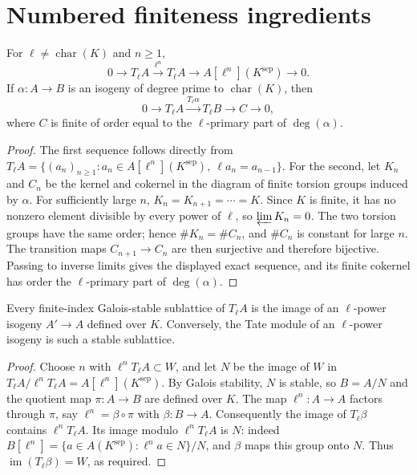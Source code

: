 \section{Numbered finiteness ingredients}

\begin{lemma}
\label{lem:milne-tate-finite-level-sequences}

For $\ell\ne\operatorname{char}(K)$ and $n\ge1$,
\[
0\longrightarrow T_\ell A\xrightarrow{\ell^n}T_\ell A
\longrightarrow A[\ell^n](K^{\mathrm{sep}})\longrightarrow0.
\]
If $\alpha:A\to B$ is an isogeny of degree prime to
$\operatorname{char}(K)$, then
\[
0\longrightarrow T_\ell A\xrightarrow{T_\ell\alpha}T_\ell B
\longrightarrow C\longrightarrow0,
\]
where $C$ is finite of order equal to the $\ell$-primary part of
$\deg(\alpha)$.
\end{lemma}

\begin{proof}

The first sequence follows directly from
$T_\ell A=\{(a_n)_{n\ge1}:a_n\in A[\ell^n](K^{\mathrm{sep}}),\ \ell a_n=a_{n-1}\}$.
For the second, let $K_n$ and $C_n$ be the kernel and cokernel in the diagram
of finite torsion groups induced by $\alpha$.  For sufficiently large $n$,
$K_n=K_{n+1}=\cdots=K$.  Since $K$ is finite, it has no nonzero element
divisible by every power of $\ell$, so $\varprojlim K_n=0$.  The two torsion
groups have the same order; hence $\#K_n=\#C_n$, and $\#C_n$ is constant for
large $n$.  The transition maps $C_{n+1}\to C_n$ are then surjective and
therefore bijective.  Passing to inverse limits gives the displayed exact
sequence, and its finite cokernel has order the $\ell$-primary part of
$\deg(\alpha)$.

\end{proof}


\begin{lemma}
\label{lem:milne-stable-tate-lattices}

Every finite-index Galois-stable sublattice of $T_\ell A$ is the image of an
$\ell$-power isogeny $A'\to A$ defined over $K$.  Conversely, the Tate module
of an $\ell$-power isogeny is such a stable sublattice.
\end{lemma}

\begin{proof}

Choose $n$ with $\ell^nT_\ell A\subset W$, and let $N$ be the image of $W$ in
$T_\ell A/\ell^nT_\ell A=A[\ell^n](K^{\mathrm{sep}})$.  By Galois stability,
$N$ is stable, so $B=A/N$ and the quotient map $\pi:A\to B$ are defined over
$K$.  The map $\ell^n:A\to A$ factors through $\pi$, say
$\ell^n=\beta\circ\pi$ with $\beta:B\to A$.  Consequently the image of
$T_\ell\beta$ contains $\ell^nT_\ell A$.  Its image modulo
$\ell^nT_\ell A$ is $N$: indeed
$B[\ell^n]=\{a\in A(K^{\mathrm{sep}}):\ell^na\in N\}/N$, and $\beta$ maps
this group onto $N$.  Thus $\operatorname{im}(T_\ell\beta)=W$, as required.

\end{proof}


